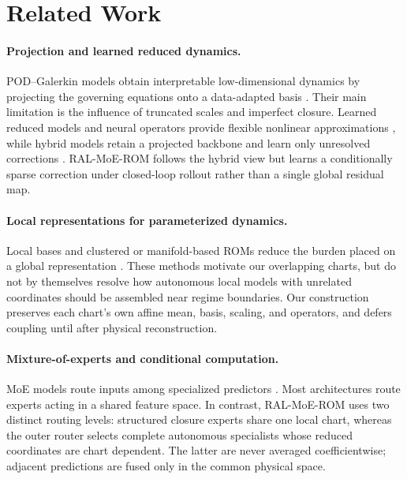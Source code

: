 \section{Related Work}

\paragraph{Projection and learned reduced dynamics.}
POD--Galerkin models obtain interpretable low-dimensional dynamics by projecting the governing equations onto a data-adapted basis \citep{sirovich1987,berkooz1993,benner2015}. Their main limitation is the influence of truncated scales and imperfect closure. Learned reduced models and neural operators provide flexible nonlinear approximations \citep{hesthaven2018,lu2021,kovachki2023}, while hybrid models retain a projected backbone and learn only unresolved corrections \citep{duraisamy2019,brunton2020,lee2020}. RAL-MoE-ROM follows the hybrid view but learns a conditionally sparse correction under closed-loop rollout rather than a single global residual map.

\paragraph{Local representations for parameterized dynamics.}
Local bases and clustered or manifold-based ROMs reduce the burden placed on a global representation \citep{amsallem2012,kaiser2014,li2021cluster,diaz2024}. These methods motivate our overlapping charts, but do not by themselves resolve how autonomous local models with unrelated coordinates should be assembled near regime boundaries. Our construction preserves each chart's own affine mean, basis, scaling, and operators, and defers coupling until after physical reconstruction.

\paragraph{Mixture-of-experts and conditional computation.}
MoE models route inputs among specialized predictors \citep{jacobs1991,jordan1994,shazeer2017,fedus2022}. Most architectures route experts acting in a shared feature space. In contrast, RAL-MoE-ROM uses two distinct routing levels: structured closure experts share one local chart, whereas the outer router selects complete autonomous specialists whose reduced coordinates are chart dependent. The latter are never averaged coefficientwise; adjacent predictions are fused only in the common physical space.
